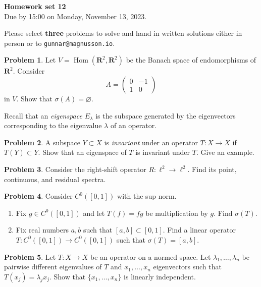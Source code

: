 \documentclass[11pt]{article}
\theoremstyle{definition}
\newtheorem{prob}{Problem}
\newcommand{\kk}[1]{\mathbf{#1}}
\DeclareMathOperator{\Hom}{Hom}
\def\head{
\begin{center}
\textbf{\LARGE Homework set 12}
\\[3pt]
Due by 15:00 on Monday, November 13, 2023.
\end{center}
\medskip
}
\begin{document}
\head

Please select \textbf{three} problems to solve and hand in written solutions
either in person or to \verb+gunnar@magnusson.io+.

\begin{prob}
Let $V = \Hom(\kk R^2, \kk R^2)$ be the Banach space of endomorphisms of $\kk R^2$.
Consider
\[
A = \begin{pmatrix}
0 & -1 
\\
1 & 0
\end{pmatrix}
\]
in $V$. Show that $\sigma(A) = \varnothing$.
\end{prob}

Recall that an \emph{eigenspace} $E_\lambda$ is the subspace generated by the
eigenvectors corresponding to the eigenvalue $\lambda$ of an operator.

\begin{prob}
A subspace $Y \subset X$ is \emph{invariant} under an operator $T : X \to X$ if
$T(Y) \subset Y$.
Show that an eigenspace of $T$ is invariant under $T$.
Give an example.
\end{prob}

\begin{prob}
Consider the right-shift operator $R : \ell^2 \to \ell^2$.
Find its point, continuous, and residual spectra.
\end{prob}

\begin{prob}
Consider $C^0([0,1])$ with the sup norm.
\begin{enumerate}
\item
Fix $g \in C^0([0,1])$ and let $T(f) = fg$ be multiplication by $g$.
Find $\sigma(T)$.

\item
Fix real numbers $a, b$ such that $[a,b] \subset [0,1]$.
Find a linear operator $T : C^0([0,1]) \to C^0([0,1])$ such that $\sigma(T) =
[a,b]$.
\end{enumerate}
\end{prob}

\begin{prob}
Let $T : X \to X$ be an operator on a normed space.
Let $\lambda_1, \ldots, \lambda_n$ be pairwise different eigenvalues of $T$
and $x_1, \ldots, x_n$ eigenvectors such that $T(x_j) = \lambda_j x_j$.
Show that $\{x_1, \ldots, x_n\}$ is linearly independent.
\end{prob}
\end{document}
